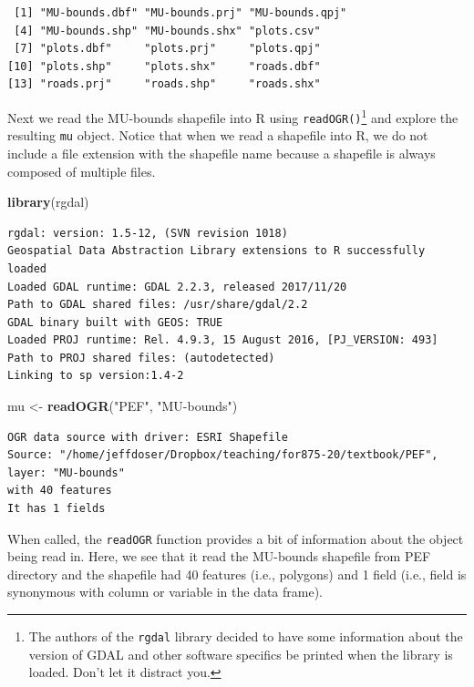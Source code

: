 \documentclass[
]{krantz}
\makeatletter
\newenvironment{Shaded}{\begin{snugshade}}{\end{snugshade}}
\newcommand{\KeywordTok}[1]{\textcolor[rgb]{0.27,0.27,0.27}{\textbf{#1}}}
\newcommand{\NormalTok}[1]{#1}
\newcommand{\StringTok}[1]{\textcolor[rgb]{0.5,0.5,0.5}{#1}}
\newenvironment{kframe}{%
\medskip{}
\setlength{\fboxsep}{.8em}
 \def\at@end@of@kframe{}%
 \ifinner\ifhmode%
  \def\at@end@of@kframe{\end{minipage}}%
  \begin{minipage}{\columnwidth}%
 \fi\fi%
 \def\FrameCommand##1{\hskip\@totalleftmargin \hskip-\fboxsep
 \colorbox{shadecolor}{##1}\hskip-\fboxsep
     \hskip-\linewidth \hskip-\@totalleftmargin \hskip\columnwidth}%
 \MakeFramed {\advance\hsize-\width
   \@totalleftmargin\z@ \linewidth\hsize
   \@setminipage}}%
 {\par\unskip\endMakeFramed%
 \at@end@of@kframe}
\renewenvironment{Shaded}{\begin{kframe}}{\end{kframe}}
\makeatother
\begin{document}
\begin{verbatim}
 [1] "MU-bounds.dbf" "MU-bounds.prj" "MU-bounds.qpj"
 [4] "MU-bounds.shp" "MU-bounds.shx" "plots.csv"    
 [7] "plots.dbf"     "plots.prj"     "plots.qpj"    
[10] "plots.shp"     "plots.shx"     "roads.dbf"    
[13] "roads.prj"     "roads.shp"     "roads.shx"    
\end{verbatim}

Next we read the MU-bounds shapefile into R using \texttt{readOGR()}\footnote{The authors of the \texttt{rgdal} library decided to have some information about the version of GDAL and other software specifics be printed when the library is loaded. Don't let it distract you.} and explore the resulting \texttt{mu} object. Notice that when we read a shapefile into R, we do not include a file extension with the shapefile name because a shapefile is always composed of multiple files.

\begin{Shaded}
\begin{Highlighting}[]
\KeywordTok{library}\NormalTok{(rgdal)}
\end{Highlighting}
\end{Shaded}

\begin{verbatim}
rgdal: version: 1.5-12, (SVN revision 1018)
Geospatial Data Abstraction Library extensions to R successfully loaded
Loaded GDAL runtime: GDAL 2.2.3, released 2017/11/20
Path to GDAL shared files: /usr/share/gdal/2.2
GDAL binary built with GEOS: TRUE 
Loaded PROJ runtime: Rel. 4.9.3, 15 August 2016, [PJ_VERSION: 493]
Path to PROJ shared files: (autodetected)
Linking to sp version:1.4-2
\end{verbatim}

\begin{Shaded}
\begin{Highlighting}[]
\NormalTok{mu \textless{}{-}}\StringTok{ }\KeywordTok{readOGR}\NormalTok{(}\StringTok{"PEF"}\NormalTok{, }\StringTok{"MU{-}bounds"}\NormalTok{)}
\end{Highlighting}
\end{Shaded}

\begin{verbatim}
OGR data source with driver: ESRI Shapefile 
Source: "/home/jeffdoser/Dropbox/teaching/for875-20/textbook/PEF", layer: "MU-bounds"
with 40 features
It has 1 fields
\end{verbatim}

When called, the \texttt{readOGR} function provides a bit of information about the object being read in. Here, we see that it read the MU-bounds shapefile from PEF directory and the shapefile had 40 features (i.e., polygons) and 1 field (i.e., field is synonymous with column or variable in the data frame).
\end{document}
